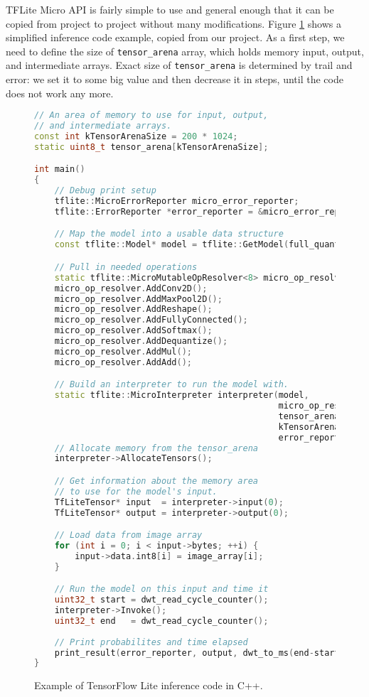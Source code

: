 TFLite Micro API is fairly simple to use and general enough that it can be copied from project to project without many modifications.
Figure \ref{inference_code} shows a simplified inference code example, copied from our project.
As a first step, we need to define the size of \verb|tensor_arena| array, which holds memory input, output, and intermediate arrays.
Exact size of \verb|tensor_arena| is determined by trail and error: we set it to some big value and then decrease it in steps, until the code does not work any more.
\clearpage
\lstset{style=mystyle}
\begin{figure}[ht] 
    \begin{lstlisting}[language=C++]
// An area of memory to use for input, output, 
// and intermediate arrays.
const int kTensorArenaSize = 200 * 1024;
static uint8_t tensor_arena[kTensorArenaSize];

int main() 
{
    // Debug print setup
    tflite::MicroErrorReporter micro_error_reporter;
    tflite::ErrorReporter *error_reporter = &micro_error_reporter;

    // Map the model into a usable data structure
    const tflite::Model* model = tflite::GetModel(full_quant_tflite);

    // Pull in needed operations
    static tflite::MicroMutableOpResolver<8> micro_op_resolver;
    micro_op_resolver.AddConv2D();
    micro_op_resolver.AddMaxPool2D();
    micro_op_resolver.AddReshape();
    micro_op_resolver.AddFullyConnected();
    micro_op_resolver.AddSoftmax();
    micro_op_resolver.AddDequantize();
    micro_op_resolver.AddMul();
    micro_op_resolver.AddAdd();

    // Build an interpreter to run the model with.
    static tflite::MicroInterpreter interpreter(model, 
                                                micro_op_resolver, 
                                                tensor_arena,
                                                kTensorArenaSize, 
                                                error_reporter);
    // Allocate memory from the tensor_arena
    interpreter->AllocateTensors();

    // Get information about the memory area 
    // to use for the model's input.
    TfLiteTensor* input  = interpreter->input(0);
    TfLiteTensor* output = interpreter->output(0);

    // Load data from image array
    for (int i = 0; i < input->bytes; ++i) {
        input->data.int8[i] = image_array[i];
    }

    // Run the model on this input and time it
    uint32_t start = dwt_read_cycle_counter();
    interpreter->Invoke();
    uint32_t end   = dwt_read_cycle_counter();
    
    // Print probabilites and time elapsed
    print_result(error_reporter, output, dwt_to_ms(end-start));
}
    \end{lstlisting}
    \caption{ Example of TensorFlow Lite inference code in C++.}
    \label{inference_code}
\end{figure}
\clearpage


